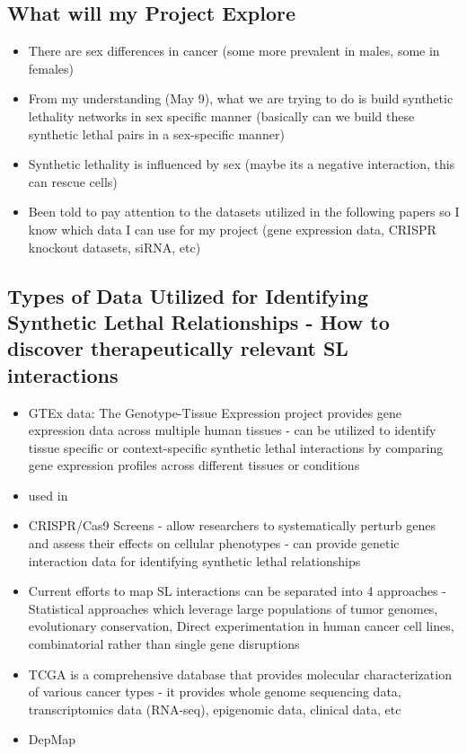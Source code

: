 \documentclass[10pt]{article}
\begin{document}
\subsection{What will my Project Explore}
\begin{itemize}
	\item There are sex differences in cancer (some more prevalent in males, some in females)
	\item From my understanding (May 9), what we are trying to do is build synthetic lethality networks in sex specific manner (basically can we build these synthetic lethal pairs in a sex-specific manner)
	\item Synthetic lethality is influenced by sex (maybe its a negative interaction, this can rescue cells)
	\item Been told to pay attention to the datasets utilized in the following papers so I know which data I can use for my project (gene expression data, CRISPR knockout datasets, siRNA, etc)
\end{itemize}

\subsection{Types of Data Utilized for Identifying Synthetic Lethal Relationships - How to discover therapeutically relevant SL interactions}
\begin{itemize}
	\item GTEx data: The Genotype-Tissue Expression project provides gene expression data across multiple human tissues - can be utilized to identify tissue specific or context-specific synthetic lethal interactions by comparing gene expression profiles across different tissues or conditions
	\item used in \citep{cheng2021synthetic}
	\item CRISPR/Cas9 Screens - allow researchers to systematically perturb genes and assess their effects on cellular phenotypes - can provide genetic interaction data for identifying synthetic lethal relationships
	\item Current efforts to map SL interactions can be separated into 4 approaches - Statistical approaches which leverage large populations of tumor genomes, evolutionary conservation, Direct experimentation in human cancer cell lines, combinatorial rather than single gene disruptions \citep{shen2018synthetic}
	\item TCGA is a comprehensive database that provides molecular characterization of various cancer types - it provides whole genome sequencing data, transcriptomics data (RNA-seq), epigenomic data, clinical data, etc
	\item DepMap
\end{itemize}
\end{document}

